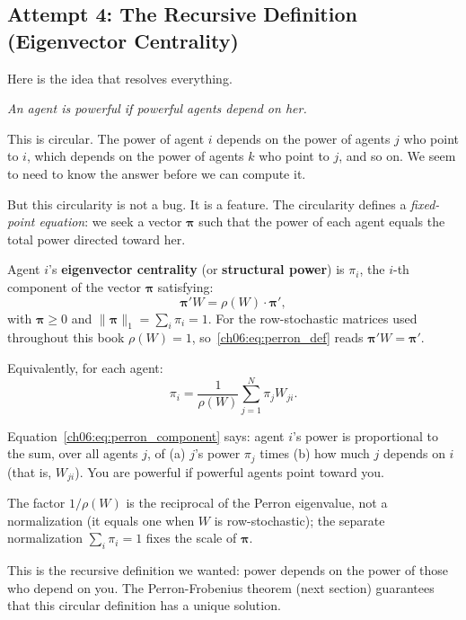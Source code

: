 \documentclass[../structural_economics_book.tex]{subfiles}
\begin{document}
\subsection{Attempt 4: The Recursive Definition (Eigenvector Centrality)}

Here is the idea that resolves everything.

\textit{An agent is powerful if powerful agents depend on her.}

This is circular. The power of agent $i$ depends on the power of agents $j$ who point to $i$, which depends on the power of agents $k$ who point to $j$, and so on. We seem to need to know the answer before we can compute it.

But this circularity is not a bug. It is a feature. The circularity defines a \textit{fixed-point equation}: we seek a vector $\boldsymbol{\pi}$ such that the power of each agent equals the total power directed toward her.

\begin{definition}\label{ch06:def:eigenvector}
Agent $i$'s \textbf{eigenvector centrality} (or \textbf{structural power}) is $\pi_i$, the $i$-th component of the vector $\boldsymbol{\pi}$ satisfying:
\begin{equation}\label{ch06:eq:perron_def}
\boldsymbol{\pi}' W = \rho(W) \cdot \boldsymbol{\pi}',
\end{equation}
with $\boldsymbol{\pi} \geq 0$ and $\|\boldsymbol{\pi}\|_1 = \sum_i \pi_i = 1$. For the row-stochastic matrices used throughout this book $\rho(W) = 1$, so~\eqref{ch06:eq:perron_def} reads $\boldsymbol{\pi}'W = \boldsymbol{\pi}'$.

Equivalently, for each agent:
\begin{equation}\label{ch06:eq:perron_component}
\pi_i = \frac{1}{\rho(W)} \sum_{j=1}^N \pi_j W_{ji}.
\end{equation}
\end{definition}

\begin{intuition}
Equation~\eqref{ch06:eq:perron_component} says: agent $i$'s power is proportional to the sum, over all agents $j$, of (a) $j$'s power $\pi_j$ times (b) how much $j$ depends on $i$ (that is, $W_{ji}$). You are powerful if powerful agents point toward you.

The factor $1/\rho(W)$ is the reciprocal of the Perron eigenvalue, not a normalization (it equals one when $W$ is row-stochastic); the separate normalization $\sum_i \pi_i = 1$ fixes the scale of $\boldsymbol{\pi}$.

This is the recursive definition we wanted: power depends on the power of those who depend on you. The Perron-Frobenius theorem (next section) guarantees that this circular definition has a unique solution.
\end{intuition}
\end{document}
